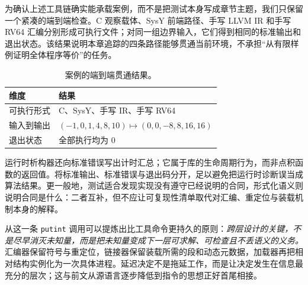 为确认上述工具链确实能承载案例，而不是把测试本身写成章节主题，我们只保留一个紧凑的端到端检查。C 观察载体、SysY 前端路径、手写 LLVM IR 和手写 RV64 汇编分别形成可执行文件；对同一组边界输入，它们得到相同的标准输出和退出状态。该结果说明本章追踪的四条路径能够贯通当前环境，不承担“从有限样例证明全体程序等价”的任务。

\begin{table}[t]
  \centering
  \caption{案例的端到端贯通结果。}
  \label{tab:execution-smoke}
  \small
  \begin{tabularx}{\textwidth}{@{}p{}X@{}}
    \toprule
    维度 & 结果 \\
    \midrule
    可执行形式 & C、SysY、手写 IR、手写 RV64 \\
    输入到输出 & \((-1,0,1,4,8,10)\mapsto(0,0,-8,8,16,16)\) \\
    退出状态 & 全部执行均为 0 \\
    \bottomrule
  \end{tabularx}
\end{table}

运行时析构器还向标准错误写出计时汇总；它属于库的生命周期行为，而非点积函数的返回值。将标准输出、标准错误与退出码分开，足以避免把运行时诊断误当成算法结果。更一般地，测试适合发现实现没有遵守已经说明的合同，形式化语义则说明合同是什么：二者互补，但不应让可复现性清单取代对汇编、重定位与装载机制本身的解释。

从这一条 \texttt{putint} 调用可以提炼出比工具命令更持久的原则：\emph{跨层设计的关键，不是尽早消灭未知量，而是把未知量变成下一层可求解、可检查且不丢语义的义务。} 汇编器保留符号与重定位，链接器保留装载所需的段和动态元数据，加载器再把相对结构实例化为一次具体进程。延迟决定不是拖延工作，而是让决定发生在信息最充分的层次；这与前文从源语言逐步降低到指令的思想正好首尾相接。
